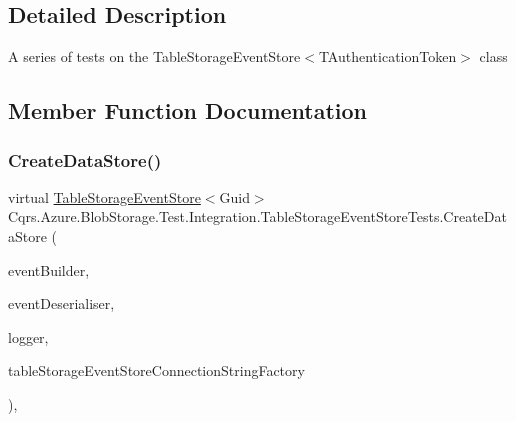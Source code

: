 \subsection{Detailed Description}
A series of tests on the Table\+Storage\+Event\+Store$<$\+T\+Authentication\+Token$>$ class 



\subsection{Member Function Documentation}
\mbox{\label{classCqrs_1_1Azure_1_1BlobStorage_1_1Test_1_1Integration_1_1TableStorageEventStoreTests_aa2b40be10577126372049c14fd951e17_aa2b40be10577126372049c14fd951e17}} 
\subsubsection{\texorpdfstring{Create\+Data\+Store()}{CreateDataStore()}}
{\footnotesize\ttfamily virtual \hyperlink{classCqrs_1_1Azure_1_1BlobStorage_1_1Events_1_1TableStorageEventStore}{Table\+Storage\+Event\+Store}$<$Guid$>$ Cqrs.\+Azure.\+Blob\+Storage.\+Test.\+Integration.\+Table\+Storage\+Event\+Store\+Tests.\+Create\+Data\+Store (\begin{DoxyParamCaption}\item[{\hyperlink{interfaceCqrs_1_1Events_1_1IEventBuilder}{I\+Event\+Builder}$<$ Guid $>$}]{event\+Builder,  }\item[{\hyperlink{interfaceCqrs_1_1Events_1_1IEventDeserialiser}{I\+Event\+Deserialiser}$<$ Guid $>$}]{event\+Deserialiser,  }\item[{I\+Logger}]{logger,  }\item[{\hyperlink{interfaceCqrs_1_1Azure_1_1BlobStorage_1_1ITableStorageStoreConnectionStringFactory}{I\+Table\+Storage\+Store\+Connection\+String\+Factory}}]{table\+Storage\+Event\+Store\+Connection\+String\+Factory }\end{DoxyParamCaption})\hspace{0.3cm}{\ttfamily [protected]}, {\ttfamily [virtual]}}



